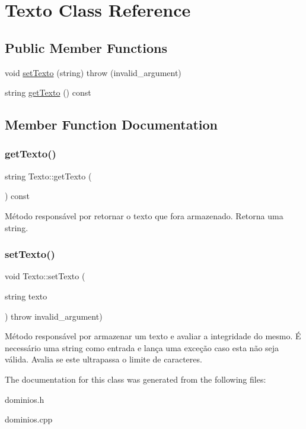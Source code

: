 \hypertarget{classTexto}{}\section{Texto Class Reference}
\label{classTexto}
\subsection*{Public Member Functions}
\begin{DoxyCompactItemize}
\item 
void \hyperlink{classTexto_a2757e0409bd76bb77c8eb6ecb09cc69d}{set\+Texto} (string)  throw (invalid\+\_\+argument)
\item 
string \hyperlink{classTexto_a69463b543f36eaf86076ef48c896987f}{get\+Texto} () const
\end{DoxyCompactItemize}


\subsection{Member Function Documentation}
\mbox{\label{classTexto_a69463b543f36eaf86076ef48c896987f}} 
\subsubsection{\texorpdfstring{get\+Texto()}{getTexto()}}
{\footnotesize\ttfamily string Texto\+::get\+Texto (\begin{DoxyParamCaption}{ }\end{DoxyParamCaption}) const\hspace{0.3cm}{\ttfamily [inline]}}

Método responsável por retornar o texto que fora armazenado. Retorna uma string. \mbox{\label{classTexto_a2757e0409bd76bb77c8eb6ecb09cc69d}} 
\subsubsection{\texorpdfstring{set\+Texto()}{setTexto()}}
{\footnotesize\ttfamily void Texto\+::set\+Texto (\begin{DoxyParamCaption}\item[{string}]{texto }\end{DoxyParamCaption}) throw  invalid\+\_\+argument) }

Método responsável por armazenar um texto e avaliar a integridade do mesmo. É necessário uma string como entrada e lança uma exceção caso esta não seja válida. Avalia se este ultrapassa o limite de caracteres. 

The documentation for this class was generated from the following files\+:\begin{DoxyCompactItemize}
\item 
dominios.\+h\item 
dominios.\+cpp\end{DoxyCompactItemize}
